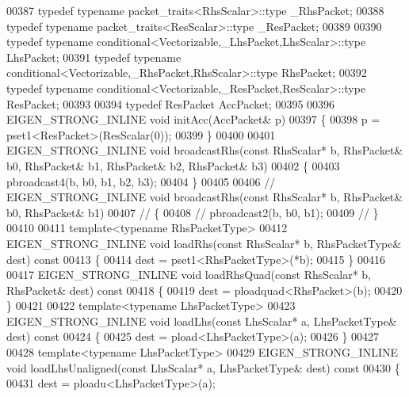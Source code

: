 \begin{DoxyCode}
00387   \textcolor{keyword}{typedef} \textcolor{keyword}{typename} packet\_traits<RhsScalar>::type  \_RhsPacket;
00388   \textcolor{keyword}{typedef} \textcolor{keyword}{typename} packet\_traits<ResScalar>::type  \_ResPacket;
00389 
00390   \textcolor{keyword}{typedef} \textcolor{keyword}{typename} conditional<Vectorizable,\_LhsPacket,LhsScalar>::type LhsPacket;
00391   \textcolor{keyword}{typedef} \textcolor{keyword}{typename} conditional<Vectorizable,\_RhsPacket,RhsScalar>::type RhsPacket;
00392   \textcolor{keyword}{typedef} \textcolor{keyword}{typename} conditional<Vectorizable,\_ResPacket,ResScalar>::type ResPacket;
00393 
00394   \textcolor{keyword}{typedef} ResPacket AccPacket;
00395   
00396   EIGEN\_STRONG\_INLINE \textcolor{keywordtype}{void} initAcc(AccPacket& p)
00397   \{
00398     p = pset1<ResPacket>(ResScalar(0));
00399   \}
00400   
00401   EIGEN\_STRONG\_INLINE \textcolor{keywordtype}{void} broadcastRhs(\textcolor{keyword}{const} RhsScalar* b, RhsPacket& b0, RhsPacket& b1, RhsPacket& b2, 
      RhsPacket& b3)
00402   \{
00403     pbroadcast4(b, b0, b1, b2, b3);
00404   \}
00405   
00406 \textcolor{comment}{//   EIGEN\_STRONG\_INLINE void broadcastRhs(const RhsScalar* b, RhsPacket& b0, RhsPacket& b1)}
00407 \textcolor{comment}{//   \{}
00408 \textcolor{comment}{//     pbroadcast2(b, b0, b1);}
00409 \textcolor{comment}{//   \}}
00410   
00411   \textcolor{keyword}{template}<\textcolor{keyword}{typename} RhsPacketType>
00412   EIGEN\_STRONG\_INLINE \textcolor{keywordtype}{void} loadRhs(\textcolor{keyword}{const} RhsScalar* b, RhsPacketType& dest)\textcolor{keyword}{ const}
00413 \textcolor{keyword}{  }\{
00414     dest = pset1<RhsPacketType>(*b);
00415   \}
00416   
00417   EIGEN\_STRONG\_INLINE \textcolor{keywordtype}{void} loadRhsQuad(\textcolor{keyword}{const} RhsScalar* b, RhsPacket& dest)\textcolor{keyword}{ const}
00418 \textcolor{keyword}{  }\{
00419     dest = ploadquad<RhsPacket>(b);
00420   \}
00421 
00422   \textcolor{keyword}{template}<\textcolor{keyword}{typename} LhsPacketType>
00423   EIGEN\_STRONG\_INLINE \textcolor{keywordtype}{void} loadLhs(\textcolor{keyword}{const} LhsScalar* a, LhsPacketType& dest)\textcolor{keyword}{ const}
00424 \textcolor{keyword}{  }\{
00425     dest = pload<LhsPacketType>(a);
00426   \}
00427 
00428   \textcolor{keyword}{template}<\textcolor{keyword}{typename} LhsPacketType>
00429   EIGEN\_STRONG\_INLINE \textcolor{keywordtype}{void} loadLhsUnaligned(\textcolor{keyword}{const} LhsScalar* a, LhsPacketType& dest)\textcolor{keyword}{ const}
00430 \textcolor{keyword}{  }\{
00431     dest = ploadu<LhsPacketType>(a);

\end{DoxyCode}
